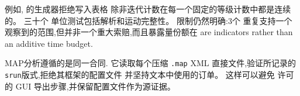 \documentclass[11pt,a4paper,oneside]{report}
\begin{document}
例如,  的生成器拒绝写入表格
除非迭代计数在每一个固定的等级计数中都是连续的。 三十个
单位测试包括解析和运动完整性。 限制仍然明确:3个
重复支持一个观察到的范围,但并非一个重大索赔,而且暴露量份额在
 are indicators rather than an additive time budget.

MAP分析遵循的是同一合同. 它读取每个压缩 \texttt{.map} XML
直接文件,验证所记录的\texttt{srun}版式,拒绝其框架的配置文件
并坚持文本中使用的订单。 这样可以避免
许可的 GUI 导出步骤,并保留配置文件作为源证据。


\end{document}
